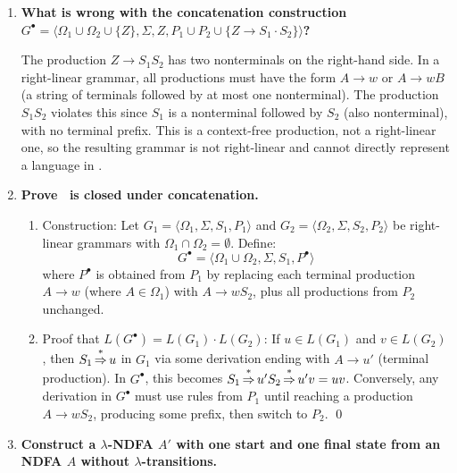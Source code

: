 \begin{enumerate}[{8.}1. ]
Therefore
\[
L(H)=\{\lambda\}\cup\{\pmb{a}^n\pmb{b}^n\pmb{c}^n\mid n\ge 2\}.
\]

\item \textbf{What is wrong with the concatenation construction $G^\bullet = \langle\Omega_1\cup\Omega_2\cup\{Z\},\Sigma,Z,P_1\cup P_2\cup\{Z\to S_1\cdot S_2\}\rangle$?}

The production $Z \to S_1 S_2$ has two nonterminals on the right-hand side. In a right-linear grammar, all productions must have the form $A \to w$ or $A \to wB$ (a string of terminals followed by at most one nonterminal). The production $S_1 S_2$ violates this since $S_1$ is a nonterminal followed by $S_2$ (also nonterminal), with no terminal prefix. This is a context-free production, not a right-linear one, so the resulting grammar is not right-linear and cannot directly represent a language in \GSIG.

\item \textbf{Prove \GSIG\ is closed under concatenation.}

\begin{enumerate}
\item Construction: Let $G_1 = \langle\Omega_1,\Sigma,S_1,P_1\rangle$ and $G_2 = \langle\Omega_2,\Sigma,S_2,P_2\rangle$ be right-linear grammars with $\Omega_1 \cap \Omega_2 = \emptyset$. Define:
\[
G^\bullet = \langle\Omega_1\cup\Omega_2,\Sigma,S_1,P^\bullet\rangle
\]
where $P^\bullet$ is obtained from $P_1$ by replacing each terminal production $A \to w$ (where $A \in \Omega_1$) with $A \to wS_2$, plus all productions from $P_2$ unchanged.

\item Proof that $L(G^\bullet) = L(G_1)\cdot L(G_2)$:
If $u \in L(G_1)$ and $v \in L(G_2)$, then $S_1 \operatorname{\overset{*}{\Rightarrow}} u$ in $G_1$ via some derivation ending with $A \to u'$ (terminal production). In $G^\bullet$, this becomes $S_1 \operatorname{\overset{*}{\Rightarrow}} u'S_2 \operatorname{\overset{*}{\Rightarrow}} u'v = uv$.
Conversely, any derivation in $G^\bullet$ must use rules from $P_1$ until reaching a production $A \to wS_2$, producing some prefix, then switch to $P_2$. \qed
\end{enumerate}

\item \textbf{Construct a $\lambda$-NDFA $A'$ with one start and one final state from an NDFA $A$ without $\lambda$-transitions.}


\end{enumerate}
